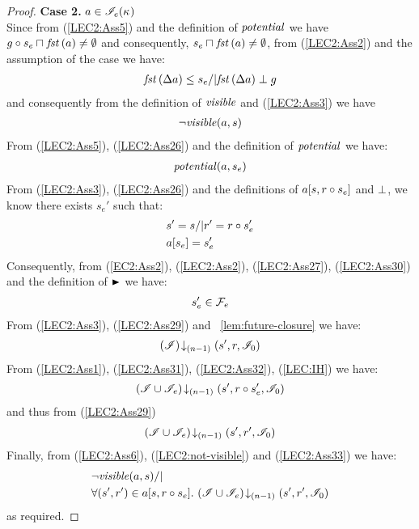\begin{lemma}
\begin{proof}
%

\noindent\textbf{Case 2. } $a \in \mathscr{I}_e(\kappa_{})$\\
Since from (\ref{LEC2:Ass5}) and the definition of $\mathit{potential}$ we have $g \circ s_e \sqcap_{} \mathit{fst}\left(a\right) \not= \emptyset$ and consequently, $s_e \sqcap_{} \mathit{fst}\left(a\right) \not= \emptyset$, from (\ref{LEC2:Ass2}) and the assumption of the case we have:
%
\begin{align}
	\mathit{fst}\left(\Delta {a}\right) \leq s_e /| \mathit{fst}\left(\Delta {a}\right) \mathrel{\bot} g \label{LEC2:Ass26}
\end{align}
% 
and consequently from the definition of $\mathit{visible}$ and (\ref{LEC2:Ass3}) we have
%
\begin{align}
	\neg\mathit{visible}(a, s)
	\label{LEC2:not-visible}
\end{align}
%
From (\ref{LEC2:Ass5}), (\ref{LEC2:Ass26}) and the definition of $\mathit{potential}$ we have:
%
\begin{align}
	\mathit{potential}(a, s_e) \label{LEC2:Ass27}
\end{align}
%
From (\ref{LEC2:Ass3}), (\ref{LEC2:Ass26}) and the definitions of $a[s, r \circ s_e]$ and $\mathrel{\bot}$, we know there exists $s_e'$ such that: 
%
\begin{align}
	& s' = s /| r' = r \circ s_e' \label{LEC2:Ass29}\\
	& a[s_e] = s_e'  \label{LEC2:Ass30}
\end{align}
%
Consequently, from (\ref{EC2:Ass2}), (\ref{LEC2:Ass2}), (\ref{LEC2:Ass27}), (\ref{LEC2:Ass30}) and the definition of $\strictfences$ we have:
%
\begin{align}
	s_e' \in \mathcal{F}_{e}  \label{LEC2:Ass31}
\end{align}
%
From (\ref{LEC2:Ass3}), (\ref{LEC2:Ass29}) and \lem~\ref{lem:future-closure} we have:
%
\begin{align}
	\left(\mathscr{I}\right) \!\downarrow_{(n-1)} \left(s', r, \mathscr{I}_0\right)  \label{LEC2:Ass32}
\end{align}
%
From (\ref{LEC2:Ass1}), (\ref{LEC2:Ass31}), (\ref{LEC2:Ass32}), (\ref{LEC:IH}) we have:
%
\begin{align*}
	\left(\mathscr{I} \cup \mathscr{I}_{e}\right) \!\downarrow_{(n-1)} \left(s', r \circ s_e', \mathscr{I}_0\right)
\end{align*}
%
and thus from (\ref{LEC2:Ass29}) 
%
\begin{align}
	\left(\mathscr{I} \cup \mathscr{I}_{e}\right) \!\downarrow_{(n-1)} \left(s', r', \mathscr{I}_0\right)
	\label{LEC2:Ass33}
\end{align}
%
Finally, from (\ref{LEC2:Ass6}), (\ref{LEC2:not-visible}) and (\ref{LEC2:Ass33}) we have:
%
\begin{align*}
	&\neg\mathit{visible}(a, s) /|\\
	& \forall (s', r') \in a[s, r \circ s_e].\, \left(\mathscr{I} \cup \mathscr{I}_{e}\right) \!\downarrow_{(n-1)} \left(s', r', \mathscr{I}_0\right)
\end{align*}
%
as required.

\end{proof}
\end{lemma}
